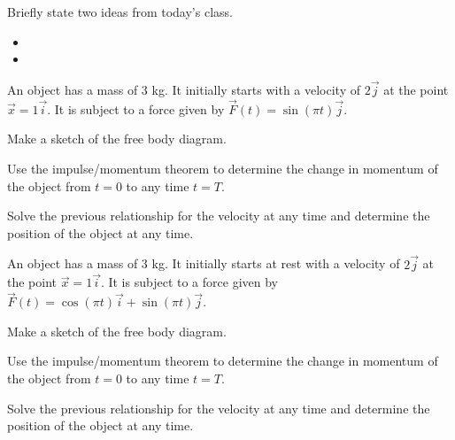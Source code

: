 \postClass

\begin{problem}
\item Briefly state two ideas from today's class.
  \begin{itemize}
  \item
  \item
  \end{itemize}
\item An object has a mass of 3 kg. It initially starts with a
  velocity of $2\vec{j}$ at the point $\vec{x}=1\vec{i}$. It is
  subject to a force given by $\vec{F}(t) = \sin(\pi t)\vec{j}$.
  \begin{subproblem}
    \item Make a sketch of the free body diagram.
      \vspace{5em}
    \item Use the impulse/momentum theorem to determine the change in
      momentum of the object from $t=0$ to any time $t=T$.
      \vfill
    \item Solve the previous relationship for the velocity at any time
      and determine the position of the object at any time.
      \vfill
  \end{subproblem}

  \clearpage

\item An object has a mass of 3 kg. It initially starts at rest with a
  velocity of $2\vec{j}$ at the point $\vec{x}=1\vec{i}$. It is
  subject to a force given by
  $\vec{F}(t) = \cos(\pi t)\vec{i}+\sin(\pi t)\vec{j}$.
  \begin{subproblem}
    \item Make a sketch of the free body diagram.
      \vspace{5em}
    \item Use the impulse/momentum theorem to determine the change in
      momentum of the object from $t=0$ to any time $t=T$.
      \vfill
    \item Solve the previous relationship for the velocity at any time
      and determine the position of the object at any time.
      \vfill
  \end{subproblem}
\end{problem}



